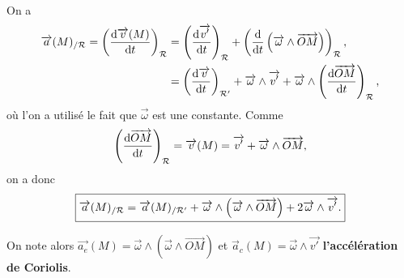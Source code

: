             On a 
            \begin{align}
                \vec{a}(M)_{/\calR}=\left(\frac{\rmd\vec{v}(M)}{\rmd t}\right)_{\calR}
                &=\left(\frac{\rmd\vec{v'}}{\rmd t}\right)_{\calR}+\left(\frac{\rmd}{\rmd t}\left(\vec{\omega}\wedge\vec{OM}\right)\right)_{\calR},\\
                &=\left(\frac{\rmd\vec{v}}{\rmd t}\right)_{\calR'}+\vec{\omega}\wedge\vec{v'}+\vec{\omega}\wedge\left(\frac{\rmd\vec{OM}}{\rmd t}\right)_{\calR},
            \end{align}
            où l'on a utilisé le fait que $\vec{\omega}$ est une constante. Comme 
            \begin{equation}
                \left(\dfrac{\rmd\vec{OM}}{\rmd t}\right)_{\calR}=\vec{v}(M)=\vec{v'}+\vec{\omega}\wedge\vec{OM},
            \end{equation}
            on a donc 
            \begin{equation}
                \boxed{
                    \vec{a}(M)_{/\calR}=\vec{a}(M)_{/\calR'}+\vec{\omega}\wedge\left(\vec{\omega}\wedge\vec{OM}\right)+2\vec{\omega}\wedge\vec{v'}.
                }
            \end{equation}

            On note alors $\vec{a_e}(M)=\vec{\omega}\wedge\left(\vec{\omega}\wedge\vec{OM}\right)$ et $\vec{a}_c(M)=\vec{\omega}\wedge\vec{v'}$ \textbf{l'accélération de Coriolis}.

